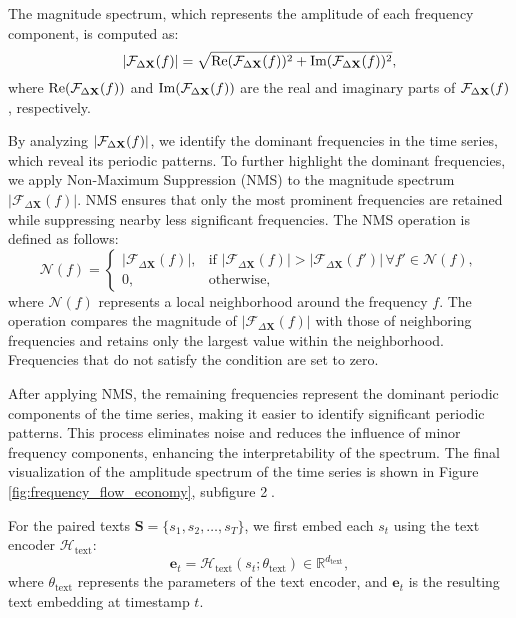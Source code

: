The magnitude spectrum, which represents the amplitude of each frequency component, is computed as:
\begin{equation}
|\mathcal{F}_{\Delta\mathbf{X}}(f)| = \sqrt{\text{Re}(\mathcal{F}_{\Delta\mathbf{X}}(f))^2 + \text{Im}(\mathcal{F}_{\Delta\mathbf{X}}(f))^2},
\end{equation}
where $\text{Re}(\mathcal{F}_{\Delta\mathbf{X}}(f))$ and $\text{Im}(\mathcal{F}_{\Delta\mathbf{X}}(f))$ are the real and imaginary parts of $\mathcal{F}_{\Delta\mathbf{X}}(f)$, respectively.

By analyzing $|\mathcal{F}_{\Delta\mathbf{X}}(f)|$, we identify the dominant frequencies in the time series, which reveal its periodic patterns. To further highlight the dominant frequencies, we apply Non-Maximum Suppression (NMS) to the magnitude spectrum $|\mathcal{F}_{\Delta\bm{X}}(f)|$. NMS ensures that only the most prominent frequencies are retained while suppressing nearby less significant frequencies. The NMS operation is defined as follows:
\begin{equation}
\mathcal{N}(f) =
\begin{cases}
|\mathcal{F}_{\Delta\bm{X}}(f)|, & \text{if } |\mathcal{F}_{\Delta\bm{X}}(f)| > |\mathcal{F}_{\Delta\bm{X}}(f')| \, \forall f' \in \mathcal{N}(f), \\
0, & \text{otherwise,}
\end{cases}
\end{equation}
where $\mathcal{N}(f)$ represents a local neighborhood around the frequency $f$. The operation compares the magnitude of $|\mathcal{F}_{\Delta\bm{X}}(f)|$ with those of neighboring frequencies and retains only the largest value within the neighborhood. Frequencies that do not satisfy the condition are set to zero.

After applying NMS, the remaining frequencies represent the dominant periodic components of the time series, making it easier to identify significant periodic patterns. This process eliminates noise and reduces the influence of minor frequency components, enhancing the interpretability of the spectrum. The final visualization of the amplitude spectrum of the time series is shown in Figure \ref{fig:frequency_flow_economy}, subfigure \textcircled{2}.


For the paired texts $\bm{S} = \{s_1, s_2, \dots, s_T\}$, we first embed each $s_t$ using the text encoder 
$\mathcal{H}_{\text{text}}$:
\begin{equation}
\bm{e}_t = \mathcal{H}_{\text{text}}(s_t; \theta_{\text{text}}) \in \mathbb{R}^{d_{\text{text}}},
\end{equation}
where $\theta_{\text{text}}$ represents the parameters of the text encoder, and $\bm{e}_t$ is the resulting text embedding at timestamp $t$.

